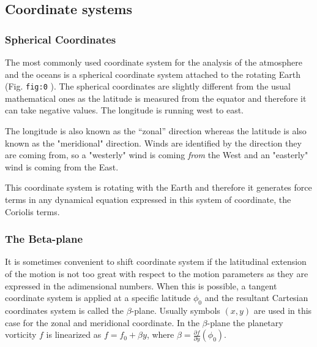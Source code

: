 \subsection{Coordinate systems}\label{coordinate-systems}

\subsubsection{Spherical Coordinates}\label{spherical-coordinates}

The most commonly used coordinate system for the analysis of the
atmosphere and the oceans is a spherical coordinate system attached to
the rotating Earth (Fig. \texttt{fig:0} ). The spherical coordinates are
slightly different from the usual mathematical ones as the latitude is
measured from the equator and therefore it can take negative values. The
longitude is running west to east.

The longitude is also known as the ``zonal'' direction whereas the
latitude is also known as the "meridional" direction. Winds are
identified by the direction they are coming from, so a "westerly" wind
is coming \emph{from} the West and an "easterly" wind is coming from the
East.

This coordinate system is rotating with the Earth and therefore it
generates force terms in any dynamical equation expressed in this system
of coordinate, the Coriolis terms.


\subsubsection{The Beta-plane}\label{the-beta-plane}

It is sometimes convenient to shift coordinate system if the latitudinal
extension of the motion is not too great with respect to the motion
parameters as they are expressed in the adimensional numbers. When this
is possible, a tangent coordinate system is applied at a specific
latitude \(\phi_0\) and the resultant Cartesian coordinates system is
called the \(\beta\)-plane. Usually symbols \((x,y)\) are used in this
case for the zonal and meridional coordinate. In the \(\beta\)-plane the
planetary vorticity \(f\) is linearized as \(f=f_0 + \beta y\), where
\(\beta = \frac{\partial f}{\partial y}({\phi_0})\).

